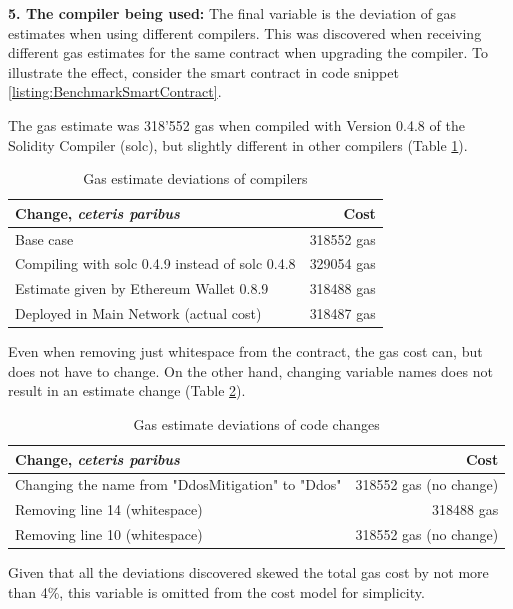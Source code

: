 \textbf{5. The compiler being used:} The final variable is the deviation of gas estimates when using different compilers. This was discovered when receiving different gas estimates for the same contract when upgrading the compiler. To illustrate the effect, consider the smart contract in code snippet \ref{listing:BenchmarkSmartContract}.

\renewcommand{\lstlistingname}{Code snippet}



The gas estimate was 318'552 gas when compiled with Version 0.4.8 of the Solidity Compiler (solc), but slightly different in other compilers (Table \ref{table:GasDeviations}).

\begin{table}
  \begin{center}
      \begin{tabular}{ l | r }
        \hline
        \textbf{Change, \textit{ceteris paribus}} & \textbf{Cost} \\ \hline
        Base case & 318552 gas \\ \hline
        Compiling with solc 0.4.9 instead of solc 0.4.8 & 329054 gas \\ \hline
        Estimate given by Ethereum Wallet 0.8.9 & 318488 gas \\ \hline
        Deployed in Main Network (actual cost) & 318487 gas \\
        \hline
      \end{tabular}
      \caption{Gas estimate deviations of compilers}
      \label{table:GasDeviations}
  \end{center}
\end{table}

Even when removing just whitespace from the contract, the gas cost can, but does not have to change. On the other hand, changing variable names does not result in an estimate change (Table \ref{table:GasDeviationsCode}).

\begin{table}
  \begin{center}
    \begin{tabular}{ l | r }
      \hline
      \textbf{Change, \textit{ceteris paribus}} & \textbf{Cost} \\ \hline
      Changing the name from "DdosMitigation" to "Ddos" & 318552 gas (no change) \\ \hline
      Removing line 14 (whitespace) & 318488 gas \\ \hline
      Removing line 10 (whitespace) & 318552 gas (no change) \\
      \hline
    \end{tabular}
    \caption{Gas estimate deviations of code changes}
    \label{table:GasDeviationsCode}
  \end{center}
\end{table}
Given that all the deviations discovered skewed the total gas cost by not more than 4\%, this variable is omitted from the cost model for simplicity.
